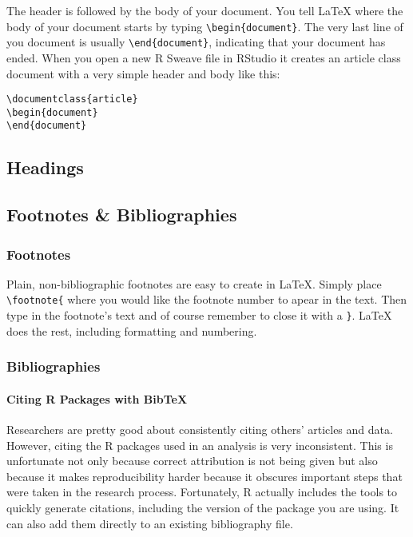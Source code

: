 The header is followed by the body of your document. You tell LaTeX where the body of your document starts by typing \texttt{\textbackslash{}begin\{document\}}. The very last line of you document is usually \texttt{\textbackslash{}end\{document\}}, indicating that your document has ended. When you open a new R Sweave file in RStudio it creates an article class document with a very simple header and body like this:

\begin{knitrout}
\color{fgcolor}\begin{kframe}
\begin{alltt}
\textbackslash{}documentclass\{article\}
\textbackslash{}begin\{document\}
\textbackslash{}end\{document\}
\end{alltt}
\end{kframe}
\end{knitrout}



\subsection{Headings}

\subsection{Footnotes \& Bibliographies}

\subsubsection{Footnotes}

Plain, non-bibliographic footnotes are easy to create in LaTeX. Simply place \texttt{\textbackslash{}footnote\{} where you would like the footnote number to apear in the text. Then type in the footnote's text and of course remember to close it with a \texttt{\}}. LaTeX does the rest, including formatting and numbering.

\subsubsection{Bibliographies}

\paragraph{Citing R Packages with BibTeX}

Researchers are pretty good about consistently citing others' articles and data. However, citing the R packages used in an analysis is very inconsistent. This is unfortunate not only because correct attribution is not being given but also because it makes reproducibility harder because it obscures important steps that were taken in the
research process. Fortunately, R actually includes the tools to quickly generate citations, including the version of the package you are using. It can also add them directly to an existing bibliography file.

